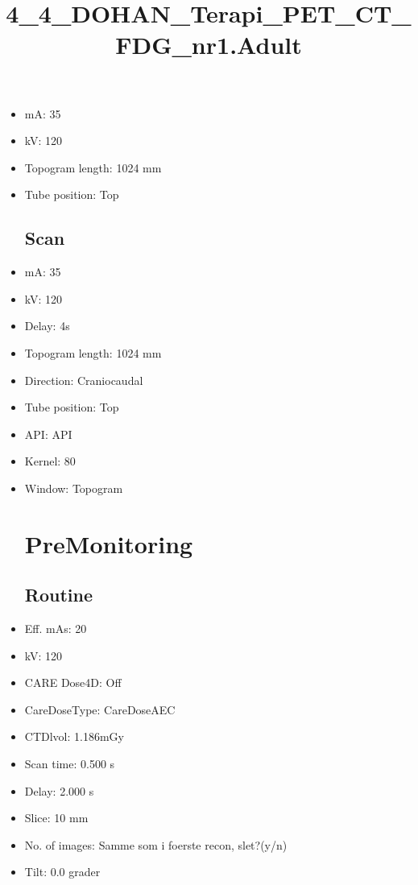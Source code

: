 \documentclass[12pt]{article}
\title{4\_4\_DOHAN\_Terapi\_PET\_CT\_FDG\_nr1.Adult}
\begin{document}
\maketitle
\newpage
\tableofcontents
\newpage
{}


\begin{itemize}\section{Topogram}
\subsection{Routine}
\item mA: 35\item kV: 120\item Topogram length: 1024 mm\item Tube position: Top
\subsection{Scan}\item mA: 35\item kV: 120\item Delay: 4s\item Topogram length: 1024 mm\item Direction: Craniocaudal\item Tube position: Top\item API: API \item Kernel: 80\item Window: Topogram
\section{PreMonitoring}
\subsection{Routine}
\item Eff. mAs: 20\item kV: 120\item CARE Dose4D: Off\item CareDoseType: CareDoseAEC\item CTDlvol: 1.186mGy\item Scan time: 0.500 s\item Delay: 2.000 s\item Slice: 10 mm\item No. of images: Samme som i foerste recon, slet?(y/n)\item Tilt: 0.0 grader

\end{itemize}
\end{document}
